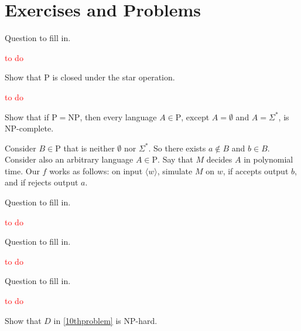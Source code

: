 \section*{Exercises and Problems}

\setcounter{exercise}{12}

\begin{exercise}{7.13}
  Question to fill in.
\end{exercise}

\textcolor{red}{to do}

\setcounter{exercise}{14}

\begin{exercise}{7.15}
  Show that P is closed under the star operation.
\end{exercise}

\textcolor{red}{to do}

\setcounter{exercise}{17}

\begin{exercise}{7.18}
  Show that if $\mathrm{P}=\mathrm{NP}$, then every language $A\in \mathrm{P}$, except $A=\emptyset$ and $A=\Sigma^*$, is NP-complete.
\end{exercise}

Consider $B\in \mathrm{P}$ that is neither $\emptyset$ nor $\Sigma^*$. So there exists $a\notin B$ and $b\in B$. Consider also an arbitrary language $A\in \mathrm{P}$. Say that $M$ decides $A$ in polynomial time. Our $f$ works as follows: on input $\langle w\rangle$, simulate $M$ on $w$, if accepts output $b$, and if rejects output $a$.

\setcounter{exercise}{25}

\begin{exercise}{7.26}
  Question to fill in.
\end{exercise}

\textcolor{red}{to do}

\begin{exercise}{7.27}
  Question to fill in.
\end{exercise}

\textcolor{red}{to do}

\begin{exercise}{7.28}
  Question to fill in.
\end{exercise}

\textcolor{red}{to do}


\setcounter{exercise}{33}

\begin{exercise}{7.34}
  Show that $D$ in \ref{10thproblem} is NP-hard.
\end{exercise}


